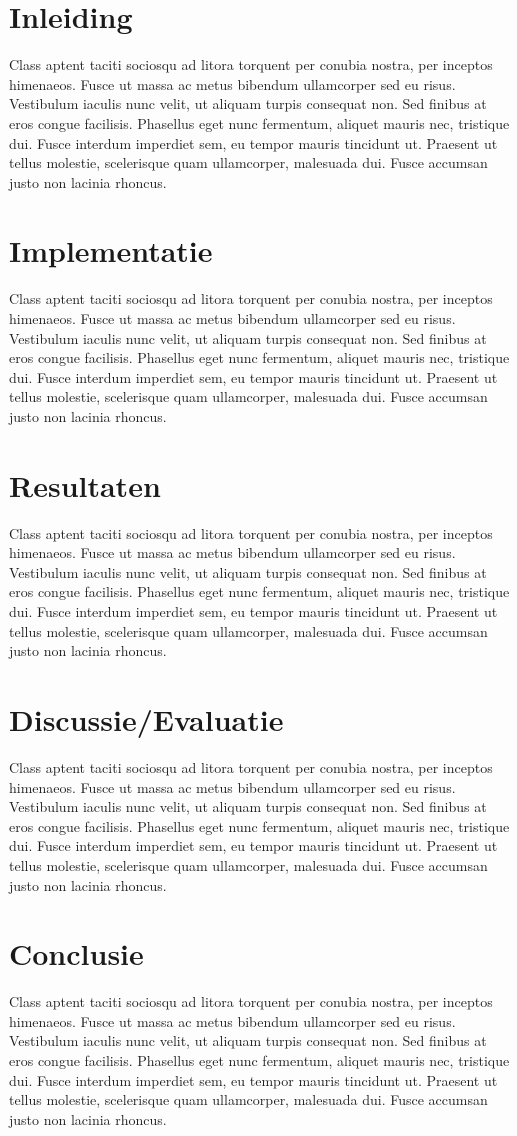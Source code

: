 \documentclass[a4paper,10pt,titlepage]{article}
\def\s{\section}                              %
\begin{document}
\s{Inleiding}

Class aptent taciti sociosqu ad litora torquent per conubia nostra, per inceptos himenaeos. Fusce ut massa ac metus bibendum ullamcorper sed eu risus. Vestibulum iaculis nunc velit, ut aliquam turpis consequat non. Sed finibus at eros congue facilisis. Phasellus eget nunc fermentum, aliquet mauris nec, tristique dui. Fusce interdum imperdiet sem, eu tempor mauris tincidunt ut. Praesent ut tellus molestie, scelerisque quam ullamcorper, malesuada dui. Fusce accumsan justo non lacinia rhoncus.

\s{Implementatie}

Class aptent taciti sociosqu ad litora torquent per conubia nostra, per inceptos himenaeos. Fusce ut massa ac metus bibendum ullamcorper sed eu risus. Vestibulum iaculis nunc velit, ut aliquam turpis consequat non. Sed finibus at eros congue facilisis. Phasellus eget nunc fermentum, aliquet mauris nec, tristique dui. Fusce interdum imperdiet sem, eu tempor mauris tincidunt ut. Praesent ut tellus molestie, scelerisque quam ullamcorper, malesuada dui. Fusce accumsan justo non lacinia rhoncus.

\s{Resultaten}

Class aptent taciti sociosqu ad litora torquent per conubia nostra, per inceptos himenaeos. Fusce ut massa ac metus bibendum ullamcorper sed eu risus. Vestibulum iaculis nunc velit, ut aliquam turpis consequat non. Sed finibus at eros congue facilisis. Phasellus eget nunc fermentum, aliquet mauris nec, tristique dui. Fusce interdum imperdiet sem, eu tempor mauris tincidunt ut. Praesent ut tellus molestie, scelerisque quam ullamcorper, malesuada dui. Fusce accumsan justo non lacinia rhoncus.

\s{Discussie/Evaluatie}

Class aptent taciti sociosqu ad litora torquent per conubia nostra, per inceptos himenaeos. Fusce ut massa ac metus bibendum ullamcorper sed eu risus. Vestibulum iaculis nunc velit, ut aliquam turpis consequat non. Sed finibus at eros congue facilisis. Phasellus eget nunc fermentum, aliquet mauris nec, tristique dui. Fusce interdum imperdiet sem, eu tempor mauris tincidunt ut. Praesent ut tellus molestie, scelerisque quam ullamcorper, malesuada dui. Fusce accumsan justo non lacinia rhoncus.

\s{Conclusie}

Class aptent taciti sociosqu ad litora torquent per conubia nostra, per inceptos himenaeos. Fusce ut massa ac metus bibendum ullamcorper sed eu risus. Vestibulum iaculis nunc velit, ut aliquam turpis consequat non. Sed finibus at eros congue facilisis. Phasellus eget nunc fermentum, aliquet mauris nec, tristique dui. Fusce interdum imperdiet sem, eu tempor mauris tincidunt ut. Praesent ut tellus molestie, scelerisque quam ullamcorper, malesuada dui. Fusce accumsan justo non lacinia rhoncus.
\end{document}
